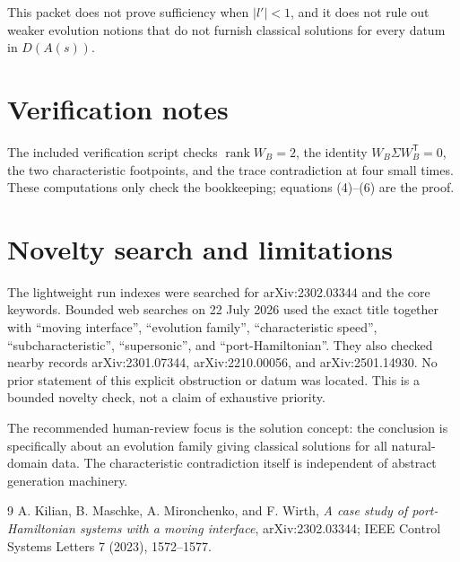 \documentclass[11pt]{article}
\begin{document}
This packet does not prove sufficiency when $|l'|<1$, and it does not rule out
weaker evolution notions that do not furnish classical solutions for every
datum in $D(A(s))$.

\section{Verification notes}

The included verification script checks
$\operatorname{rank}W_B=2$, the identity
$W_B\Sigma W_B^{\mathsf T}=0$, the two characteristic footpoints, and the
trace contradiction at four small times.  These computations only check the
bookkeeping; equations (4)--(6) are the proof.

\section{Novelty search and limitations}

The lightweight run indexes were searched for arXiv:2302.03344 and the core
keywords.  Bounded web searches on 22 July 2026 used the exact title together
with ``moving interface'', ``evolution family'', ``characteristic speed'',
``subcharacteristic'', ``supersonic'', and ``port-Hamiltonian''.  They also
checked nearby records arXiv:2301.07344, arXiv:2210.00056, and
arXiv:2501.14930.  No prior statement of this explicit obstruction or datum
was located.  This is a bounded novelty check, not a claim of exhaustive
priority.

The recommended human-review focus is the solution concept: the conclusion
is specifically about an evolution family giving classical solutions for all
natural-domain data.  The characteristic contradiction itself is independent
of abstract generation machinery.

\begin{thebibliography}{9}
A. Kilian, B. Maschke, A. Mironchenko, and F. Wirth,
\emph{A case study of port-Hamiltonian systems with a moving interface},
arXiv:2302.03344; IEEE Control Systems Letters 7 (2023), 1572--1577.
\end{thebibliography}
\end{document}
